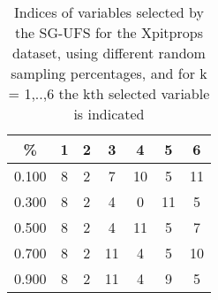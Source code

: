 \begin{table}
	\begin{center}
		\begin{tabular}{c c c c c c c}
			\% & 1 & 2 & 3 & 4 & 5 & 6 \\
			\hline
			0.100 & 8 & 2 & 7 & 10 & 5 & 11 \\
			0.300 & 8 & 2 & 4 & 0 & 11 & 5 \\
			0.500 & 8 & 2 & 4 & 11 & 5 & 7 \\
			0.700 & 8 & 2 & 11 & 4 & 5 & 10 \\
			0.900 & 8 & 2 & 11 & 4 & 9 & 5 \\
		\end{tabular}
	\end{center}
	\caption{Indices of variables selected by the SG-UFS for the Xpitprops dataset, using different random sampling percentages, and for k = 1,..,6 the kth selected variable is indicated}
\end{table}